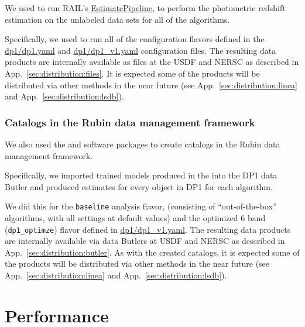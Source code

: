 We used  to run RAIL’s  \href{https://github.com/LSSTDESC/rail_pipelines/blob/main/src/rail/pipelines/estimation/estimate_all.py}{EstimatePipeline}, to perform the photometric redshift estimation on the unlabeled data sets for all of the algorithms.

Specifically, we used  to run all of the configuration flavors defined in the \href{https://github.com/LSSTDESC/rail_project_config/blob/main/dp1/dp1.yaml}{dp1/dp1.yaml} and \href{https://github.com/LSSTDESC/rail_project_config/blob/main/dp1/dp1.yaml}{dp1/dp1\_v1.yaml} configuration files.
The resulting data products are internally available as files at the USDF and NERSC as described in App.~\ref{sec:distribution:files}.   It is expected some of the products will be distributed via other methods in the near future (see App.~\ref{sec:distribution:linea} and App.~\ref{sec:distribution:lsdb}).


\subsubsection{Catalogs in the Rubin data management framework}
\label{sec:method:redshift_catalogs:dm}

We also used the \href{https://github.com/lsst-dm/meas_pz}{} and \href{https://github.com/lsst-dm/meas_pz}{} software packages
to create \photoz catalogs in the Rubin data management framework.

Specifically, we imported trained models produced in the  into the DP1 data Butler and produced \photoz estimates for every object in DP1 for each algorithm.

We did this for the \texttt{baseline} analysis flavor, (consisting of ``out-of-the-box'' algorithms, with all settings at default values) and the optimized 6 band (\texttt{dp1\_optimze}) flavor defined in \href{https://github.com/LSSTDESC/rail_project_config/blob/main/dp1/dp1.yaml}{dp1/dp1\_v1.yaml}.
The resulting data products are internally available via data Butlers at USDF and NERSC as described in App.~\ref{sec:distribution:butler}.   As with the  created catalogs, it is expected some of the products will be distributed via other methods in the near future (see App.~\ref{sec:distribution:linea} and App.~\ref{sec:distribution:lsdb}).


\section{Performance}
\label{sec:performance:0}

